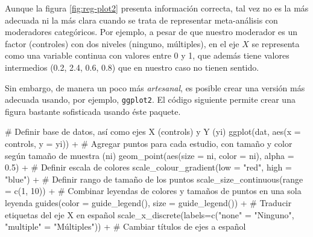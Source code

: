 \documentclass[
  bookmarksnumbered]{article}
\newenvironment{Shaded}{\begin{snugshade}}{\end{snugshade}}
\newcommand{\AttributeTok}[1]{\textcolor[rgb]{0.00,0.34,0.68}{#1}}
\newcommand{\CommentTok}[1]{\textcolor[rgb]{0.54,0.53,0.53}{#1}}
\newcommand{\DecValTok}[1]{\textcolor[rgb]{0.69,0.50,0.00}{#1}}
\newcommand{\FloatTok}[1]{\textcolor[rgb]{0.69,0.50,0.00}{#1}}
\newcommand{\FunctionTok}[1]{\textcolor[rgb]{0.39,0.29,0.61}{#1}}
\newcommand{\NormalTok}[1]{\textcolor[rgb]{0.12,0.11,0.11}{#1}}
\newcommand{\OtherTok}[1]{\textcolor[rgb]{0.00,0.43,0.16}{#1}}
\newcommand{\SpecialCharTok}[1]{\textcolor[rgb]{0.24,0.68,0.91}{#1}}
\newcommand{\StringTok}[1]{\textcolor[rgb]{0.75,0.01,0.01}{#1}}
\begin{document}
Aunque la figura \ref{fig:reg-plot2} presenta información correcta, tal vez no es la más adecuada ni la más clara cuando se trata de representar meta-análisis con moderadores categóricos. Por ejemplo, a pesar de que nuestro moderador es un factor (controles) con dos niveles (ninguno, múltiples), en el eje \(X\) se representa como una variable continua con valores entre 0 y 1, que además tiene valores intermedios (0.2, 2.4, 0.6, 0.8) que en nuestro caso no tienen sentido.

Sin embargo, de manera un poco más \emph{artesanal}, es posible crear una versión más adecuada usando, por ejemplo, \texttt{ggplot2}. El código siguiente permite crear una figura bastante sofisticada usando éste paquete.

\begin{Shaded}
\begin{Highlighting}[]
\CommentTok{\# Definir base de datos, así como ejes X (controls) y Y (yi)}
\FunctionTok{ggplot}\NormalTok{(dat, }\FunctionTok{aes}\NormalTok{(}\AttributeTok{x =}\NormalTok{ controls, }\AttributeTok{y =}\NormalTok{ yi)) }\SpecialCharTok{+}
  \CommentTok{\# Agregar puntos para cada estudio, con tamaño y color según tamaño de muestra (ni)}
  \FunctionTok{geom\_point}\NormalTok{(}\FunctionTok{aes}\NormalTok{(}\AttributeTok{size =}\NormalTok{ ni, }\AttributeTok{color =}\NormalTok{ ni),}
             \AttributeTok{alpha =} \FloatTok{0.5}\NormalTok{) }\SpecialCharTok{+}
  \CommentTok{\# Definir escala de colores}
  \FunctionTok{scale\_colour\_gradient}\NormalTok{(}\AttributeTok{low =} \StringTok{"red"}\NormalTok{,}
                        \AttributeTok{high =} \StringTok{"blue"}\NormalTok{) }\SpecialCharTok{+}
  \CommentTok{\# Definir rango de tamaño de los puntos}
  \FunctionTok{scale\_size\_continuous}\NormalTok{(}\AttributeTok{range =} \FunctionTok{c}\NormalTok{(}\DecValTok{1}\NormalTok{, }\DecValTok{10}\NormalTok{)) }\SpecialCharTok{+}
  \CommentTok{\# Combinar leyendas de colores y tamaños de puntos en una sola leyenda}
  \FunctionTok{guides}\NormalTok{(}\AttributeTok{color =} \FunctionTok{guide\_legend}\NormalTok{(), }
         \AttributeTok{size =} \FunctionTok{guide\_legend}\NormalTok{()) }\SpecialCharTok{+}
  \CommentTok{\# Traducir etiquetas del eje X en español}
  \FunctionTok{scale\_x\_discrete}\NormalTok{(}\AttributeTok{labels=}\FunctionTok{c}\NormalTok{(}\StringTok{"none"} \OtherTok{=} \StringTok{"Ninguno"}\NormalTok{, }
                            \StringTok{"multiple"} \OtherTok{=} \StringTok{"Múltiples"}\NormalTok{)) }\SpecialCharTok{+}
  \CommentTok{\# Cambiar títulos de ejes a español}

\end{Highlighting}
\end{Shaded}
\end{document}
